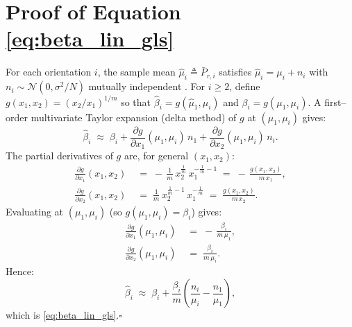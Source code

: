 \documentclass[journal]{IEEEtran}
\begin{document}
\section{Proof of Equation \eqref{eq:beta_lin_gls}}
\label{app:beta_lin_gls}
For each orientation \(i\), the sample mean \(\hat\mu_i\triangleq\bar P_{r,i}\) satisfies
\(\hat\mu_i=\mu_i+n_i\) with \(n_i\sim\mathcal N(0,\sigma^2/N)\) mutually independent \cite{Kay1993}. 
For \(i\ge2\), define 
\(g(x_1,x_2)\!=\!(x_2/x_1)^{1/m}\) so that \(\hat\beta_i=g(\hat\mu_1,\hat\mu_i)\) and \(\beta_i=g(\mu_1,\mu_i)\).
A first–order multivariate Taylor expansion (delta method) of \(g\) at \((\mu_1,\mu_i)\) gives:
\begin{equation}
\hat{\beta}_i \;\approx\; \beta_i
+ \frac{\partial g}{\partial x_1}(\mu_1,\mu_i)\,n_1
+ \frac{\partial g}{\partial x_2}(\mu_1,\mu_i)\,n_i. 
\end{equation}
The partial derivatives of \(g\) are, for general \((x_1,x_2)\):
\begin{subequations}
\begin{align}
\frac{\partial g}{\partial x_1}(x_1,x_2) \;&=\; -\,\frac{1}{m}\,x_2^{\frac{1}{m}}\,x_1^{-\frac{1}{m}-1}
\;=\; -\,\frac{g(x_1,x_2)}{m\,x_1},\\[4pt]
\frac{\partial g}{\partial x_2}(x_1,x_2) \;&=\; \frac{1}{m}\,x_2^{\frac{1}{m}-1}\,x_1^{-\frac{1}{m}}
\;=\; \frac{g(x_1,x_2)}{m\,x_2}.
\end{align}
\end{subequations}
Evaluating at \((\mu_1,\mu_i)\) (so \(g(\mu_1,\mu_i)=\beta_i\)) gives:
\begin{subequations}
\begin{align}
\frac{\partial g}{\partial x_1}(\mu_1,\mu_i) \;&=\; -\,\frac{\beta_i}{m\,\mu_1},\\[2pt]
\frac{\partial g}{\partial x_2}(\mu_1,\mu_i) \;&=\; \frac{\beta_i}{m\,\mu_i}.
\end{align}
\end{subequations}
Hence:
\begin{equation}
\hat{\beta}_i \;\approx\; \beta_i
+ \frac{\beta_i}{m}\!\left(\frac{n_i}{\mu_i} - \frac{n_1}{\mu_1}\right),
\end{equation}
which is \eqref{eq:beta_lin_gls}.\hfill\(\square\)
\end{document}

